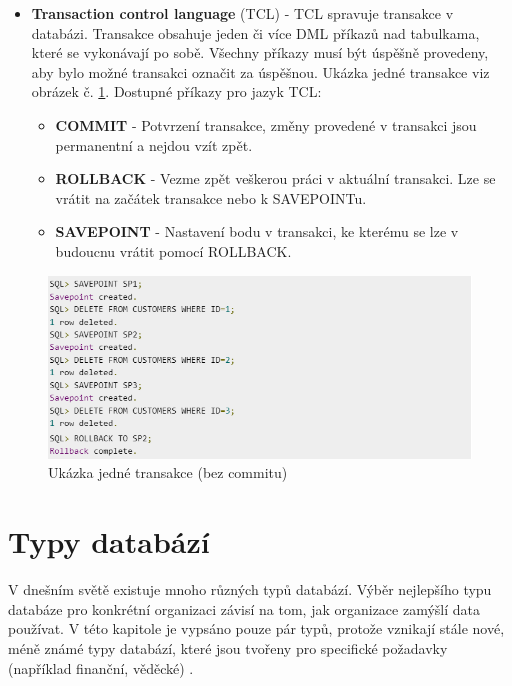 \begin{itemize}
\item \textbf{Transaction control language} (TCL) - TCL spravuje transakce v databázi. Transakce obsahuje jeden či více DML příkazů nad tabulkama, které se vykonávají po sobě. Všechny příkazy musí být úspěšně provedeny, aby bylo možné transakci označit za úspěšnou. Ukázka jedné transakce viz obrázek č. \ref{fig:tcl_savepoint}. Dostupné příkazy pro jazyk TCL:
	\begin{itemize}
	\item \textbf{COMMIT} - Potvrzení transakce, změny provedené v transakci jsou permanentní a nejdou vzít zpět.
	\item \textbf{ROLLBACK} - Vezme zpět veškerou práci v aktuální transakci. Lze se vrátit na začátek transakce nebo k SAVEPOINTu.
	\item \textbf{SAVEPOINT} - Nastavení bodu v transakci, ke kterému se lze v budoucnu vrátit pomocí ROLLBACK.
	\end{itemize}
\end{itemize}
	\begin{figure}[H]
	\centering
	\includegraphics[width=14cm]{img/databaze/tcl_savepoint}
	\caption{Ukázka jedné transakce (bez commitu)}
	\label{fig:tcl_savepoint}
	\end{figure}
\section{Typy databází}
V dnešním světě existuje mnoho různých typů databází. Výběr nejlepšího typu databáze pro konkrétní organizaci závisí na tom, jak organizace zamýšlí data používat. V této kapitole je vypsáno pouze pár typů, protože vznikají stále nové, méně známé typy databází, které jsou tvořeny pro specifické požadavky (například finanční, věděcké) \cite{matillionTypeDB, OracleDB}.
